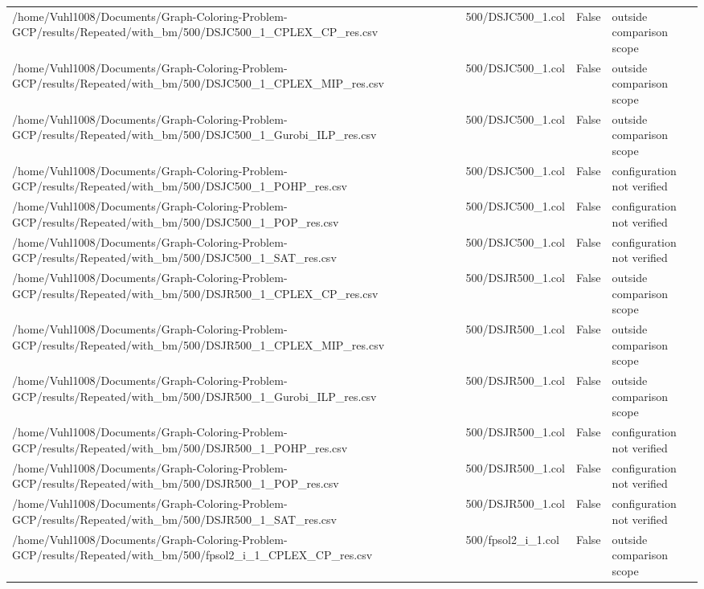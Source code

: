 \begin{table}[htbp]
\begin{tabular}{llll}
/home/Vuhl1008/Documents/Graph-Coloring-Problem-GCP/results/Repeated/with\_bm/500/DSJC500\_1\_CPLEX\_CP\_res.csv & 500/DSJC500\_1.col & False & outside comparison scope \\
/home/Vuhl1008/Documents/Graph-Coloring-Problem-GCP/results/Repeated/with\_bm/500/DSJC500\_1\_CPLEX\_MIP\_res.csv & 500/DSJC500\_1.col & False & outside comparison scope \\
/home/Vuhl1008/Documents/Graph-Coloring-Problem-GCP/results/Repeated/with\_bm/500/DSJC500\_1\_Gurobi\_ILP\_res.csv & 500/DSJC500\_1.col & False & outside comparison scope \\
/home/Vuhl1008/Documents/Graph-Coloring-Problem-GCP/results/Repeated/with\_bm/500/DSJC500\_1\_POHP\_res.csv & 500/DSJC500\_1.col & False & configuration not verified \\
/home/Vuhl1008/Documents/Graph-Coloring-Problem-GCP/results/Repeated/with\_bm/500/DSJC500\_1\_POP\_res.csv & 500/DSJC500\_1.col & False & configuration not verified \\
/home/Vuhl1008/Documents/Graph-Coloring-Problem-GCP/results/Repeated/with\_bm/500/DSJC500\_1\_SAT\_res.csv & 500/DSJC500\_1.col & False & configuration not verified \\
/home/Vuhl1008/Documents/Graph-Coloring-Problem-GCP/results/Repeated/with\_bm/500/DSJR500\_1\_CPLEX\_CP\_res.csv & 500/DSJR500\_1.col & False & outside comparison scope \\
/home/Vuhl1008/Documents/Graph-Coloring-Problem-GCP/results/Repeated/with\_bm/500/DSJR500\_1\_CPLEX\_MIP\_res.csv & 500/DSJR500\_1.col & False & outside comparison scope \\
/home/Vuhl1008/Documents/Graph-Coloring-Problem-GCP/results/Repeated/with\_bm/500/DSJR500\_1\_Gurobi\_ILP\_res.csv & 500/DSJR500\_1.col & False & outside comparison scope \\
/home/Vuhl1008/Documents/Graph-Coloring-Problem-GCP/results/Repeated/with\_bm/500/DSJR500\_1\_POHP\_res.csv & 500/DSJR500\_1.col & False & configuration not verified \\
/home/Vuhl1008/Documents/Graph-Coloring-Problem-GCP/results/Repeated/with\_bm/500/DSJR500\_1\_POP\_res.csv & 500/DSJR500\_1.col & False & configuration not verified \\
/home/Vuhl1008/Documents/Graph-Coloring-Problem-GCP/results/Repeated/with\_bm/500/DSJR500\_1\_SAT\_res.csv & 500/DSJR500\_1.col & False & configuration not verified \\
/home/Vuhl1008/Documents/Graph-Coloring-Problem-GCP/results/Repeated/with\_bm/500/fpsol2\_i\_1\_CPLEX\_CP\_res.csv & 500/fpsol2\_i\_1.col & False & outside comparison scope \\

\end{tabular}
\end{table}
